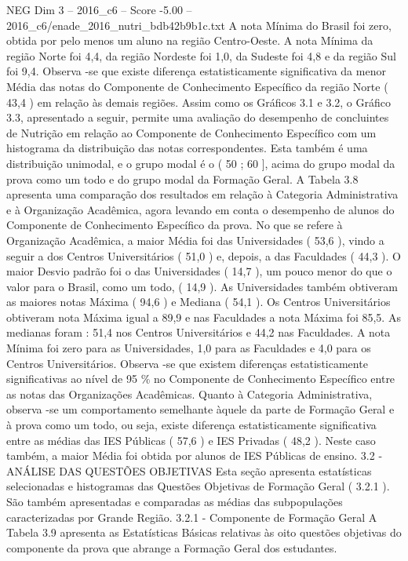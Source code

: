 \begin{textsample}{NEG Dim 3 – 2016\_c6 – Score -5.00 – 2016\_c6/enade\_2016\_nutri\_bdb42b9b1c.txt}
A nota Mínima do Brasil foi zero, obtida por pelo menos um aluno na região Centro-Oeste.
A nota Mínima da região Norte foi 4,4, da região Nordeste foi 1,0, da Sudeste foi 4,8 e da região Sul foi 9,4.
Observa -se que existe diferença estatisticamente significativa da menor Média das notas do Componente de Conhecimento Específico da região Norte ( 43,4 ) em relação às demais regiões.
Assim como os Gráficos 3.1 e 3.2, o Gráfico 3.3, apresentado a seguir, permite uma avaliação do desempenho de concluintes de Nutrição em relação ao Componente de Conhecimento Específico com um histograma da distribuição das notas correspondentes.
Esta também é uma distribuição unimodal, e o grupo modal é o ( 50 ; 60 ], acima do grupo modal da prova como um todo e do grupo modal da Formação Geral.
A Tabela 3.8 apresenta uma comparação dos resultados em relação à Categoria Administrativa e à Organização Acadêmica, agora levando em conta o desempenho de alunos do Componente de Conhecimento Específico da prova.
No que se refere à Organização Acadêmica, a maior Média foi das Universidades ( 53,6 ), vindo a seguir a dos Centros Universitários ( 51,0 ) e, depois, a das Faculdades ( 44,3 ).
O maior Desvio padrão foi o das Universidades ( 14,7 ), um pouco menor do que o valor para o Brasil, como um todo, ( 14,9 ).
As Universidades também obtiveram as maiores notas Máxima ( 94,6 ) e Mediana ( 54,1 ).
Os Centros Universitários obtiveram nota Máxima igual a 89,9 e nas Faculdades a nota Máxima foi 85,5.
As medianas foram : 51,4 nos Centros Universitários e 44,2 nas Faculdades.
A nota Mínima foi zero para as Universidades, 1,0 para as Faculdades e 4,0 para os Centros Universitários.
Observa -se que existem diferenças estatisticamente significativas ao nível de 95 \% no Componente de Conhecimento Específico entre as notas das Organizações Acadêmicas.
Quanto à Categoria Administrativa, observa -se um comportamento semelhante àquele da parte de Formação Geral e à prova como um todo, ou seja, existe diferença estatisticamente significativa entre as médias das IES Públicas ( 57,6 ) e IES Privadas ( 48,2 ).
Neste caso também, a maior Média foi obtida por alunos de IES Públicas de ensino. 3.2 - ANÁLISE DAS QUESTÕES OBJETIVAS Esta seção apresenta estatísticas selecionadas e histogramas das Questões Objetivas de Formação Geral ( 3.2.1 ).
São também apresentadas e comparadas as médias das subpopulações caracterizadas por Grande Região. 3.2.1 - Componente de Formação Geral A Tabela 3.9 apresenta as Estatísticas Básicas relativas às oito questões objetivas do componente da prova que abrange a Formação Geral dos estudantes.

\end{textsample}
